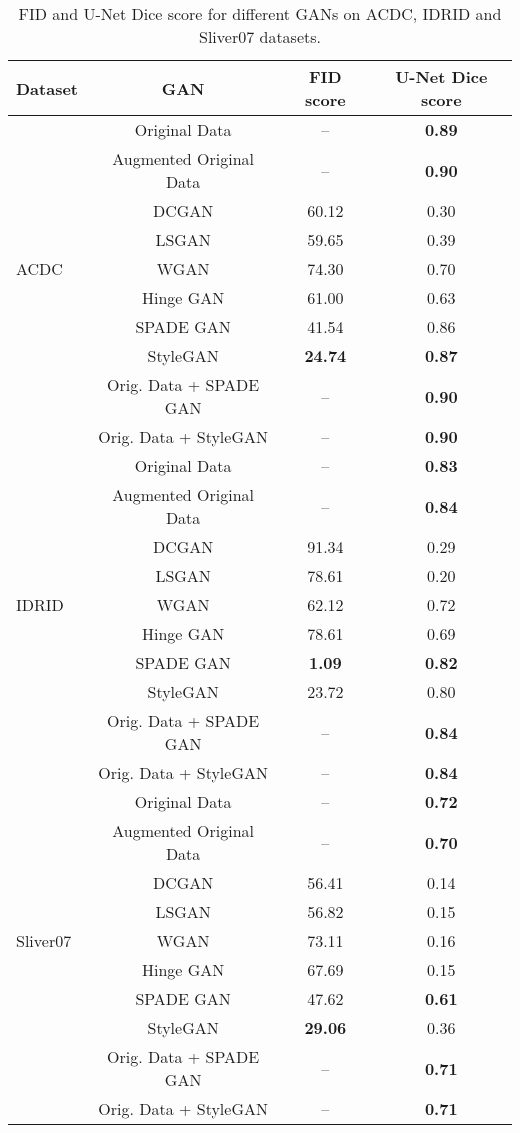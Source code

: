 \documentclass[preprint,12pt, authoryear]{elsarticle}
\begin{document}
\begin{table}
\centering
\caption{\small FID and U-Net Dice score for different GANs on ACDC, IDRID and Sliver07 datasets.}
\begin{tabular}{l|c|c|c} 
\hline
Dataset & GAN       & FID score & U-Net Dice score \\ 
\hline
& Original Data & --   & \textbf{0.89}  \\ 
& Augmented Original Data & --   & \textbf{0.90}  \\
\hline
& DCGAN     & 60.12     & 0.30  \\ 
& LSGAN     & 59.65     & 0.39  \\ 
ACDC & WGAN      & 74.30     & 0.70 \\ 
& Hinge GAN & 61.00     & 0.63  \\ 
& SPADE GAN & 41.54     & 0.86  \\ 
& StyleGAN  & \textbf{24.74}     & \textbf{0.87}  \\
& Orig. Data + SPADE GAN & --     & \textbf{0.90} \\ 
& Orig. Data + StyleGAN  & --     & \textbf{0.90}  \\
\hline
\hline
& Original Data & --   & \textbf{0.83}  \\ 
& Augmented Original Data & --   & \textbf{0.84}  \\ 
\hline
& DCGAN     & 91.34     & 0.29  \\ 
& LSGAN     & 78.61     & 0.20  \\ 
IDRID & WGAN      & 62.12     & 0.72 \\ 
& Hinge GAN & 78.61     & 0.69  \\ 
& SPADE GAN & \textbf{1.09}     & \textbf{0.82}  \\ 
& StyleGAN  & 23.72     & 0.80   \\
& Orig. Data + SPADE GAN & --     & \textbf{0.84}  \\ 
& Orig. Data + StyleGAN  & --    & \textbf{0.84}  \\
\hline
\hline
& Original Data & --   & \textbf{0.72}  \\
& Augmented Original Data & --   & \textbf{0.70}  \\
\hline
& DCGAN     & 56.41     & 0.14  \\ 
& LSGAN     & 56.82     & 0.15  \\ 
Sliver07 & WGAN      & 73.11     & 0.16 \\ 
& Hinge GAN & 67.69     & 0.15  \\ 
& SPADE GAN & 47.62     & \textbf{0.61}  \\ 
& StyleGAN  & \textbf{29.06}     & 0.36  \\
& Orig. Data + SPADE GAN & --     & \textbf{0.71}  \\ 
& Orig. Data + StyleGAN  & --     & \textbf{0.71}  \\
\hline
\end{tabular}
\label{tab_fid_dice}
\end{table}
\end{document}
